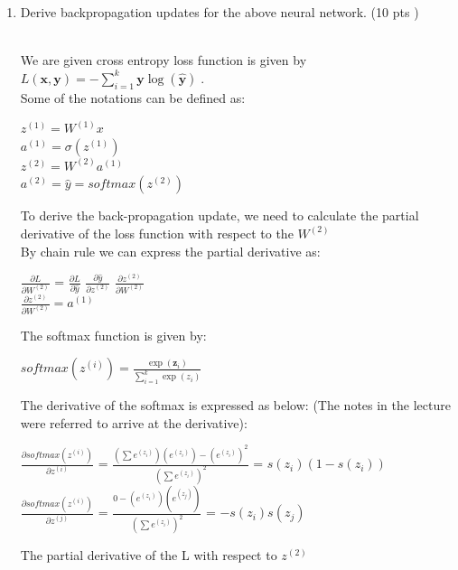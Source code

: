 \documentclass[a4paper]{article}
\theoremstyle{definition}
\renewcommand\vec[1]{\boldsymbol{#1}}
\newenvironment{soln}{
    \leavevmode\color{blue}\ignorespaces
}{}
\begin{document}
\begin{enumerate}
    \item Derive backpropagation updates for the above neural network. (10 pts )
    \begin{soln}
    \\We are given cross entropy loss function is given by $L(\vec x,\vec y) = -\sum_{i=1}^k 
\vec y \log (\hat{\vec y})\;. $ \\
	Some of the notations can be defined as: \\
	\begin{center}
	$z^{(1)} = W^{(1)}x$ \\
	$a^{(1)} = \sigma(z^{(1)})$\\
	$z^{(2)} = W^{(2)}a^{(1)}$ \\
	$a^{(2)} = \hat y = softmax(z^{(2)})$ \\
	\end{center}
	To derive the back-propagation update, we need to calculate the partial derivative of the loss function with respect to the $W^{(2)}$\\
	By chain rule we can express the partial derivative as:\\
	\begin{center}
	$\frac{\partial L}{\partial W^{(2)}}$ = $\frac{\partial L}{\partial \hat y}$ $\frac{\partial \hat y}{\partial z^{(2)}}$ $\frac{\partial z^{(2)}}{\partial W^{(2)}}$\\
	$\frac{\partial z^{(2)}}{\partial W^{(2)}} = a^{(1)}$ \\
	\end{center}
	The softmax function is given by: \\
	\begin{center}
	$softmax(z^{(i)}) = \frac{\exp(\vec z_i)}{\sum_{i=1}^k  \exp(z_i)}$\\
	\end{center}
	The derivative of the softmax is expressed as below: (The notes in the lecture were referred to arrive at the derivative):\\
	\begin{center}
	$\frac{\partial softmax(z^{(i)})}{\partial z^{(i)}}$ = $\frac{(\sum e^{(z_i)}) (e^{(z_i)}) - {(e^{(z_i)})}^2} {{(\sum e^{(z_i)})}^2}$ = $s(z_i)(1 - s(z_i))$\\
	$\frac{\partial softmax(z^{(i)})}{\partial z^{(j)}}$ = $\frac{0 - (e^{(z_i)}) (e^{(z_j)})} {{(\sum e^{(z_i)})}^2}$ = $ - s(z_i) s(z_j)$\\
	\end{center}
	The partial derivative of the L with respect to $z^{(2)}$\\

\end{soln}
\end{enumerate}
\end{document}
